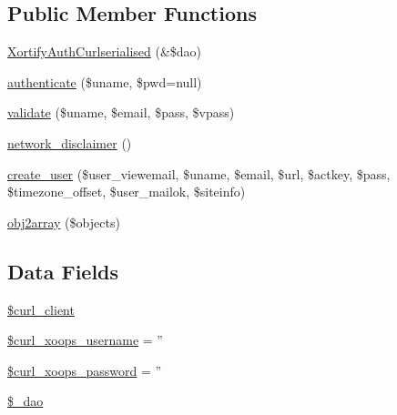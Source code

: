 \subsection*{Public Member Functions}
\begin{DoxyCompactItemize}
\item 
\hyperlink{class_xortify_auth_curlserialised_a5a69ea149424b5e92245daaa880dbb43}{Xortify\-Auth\-Curlserialised} (\&\$dao)
\item 
\hyperlink{class_xortify_auth_curlserialised_a00678ba307326b734e6c679f28bea315}{authenticate} (\$uname, \$pwd=null)
\item 
\hyperlink{class_xortify_auth_curlserialised_a91121a1b702dfd20fb65a027c8ed26ec}{validate} (\$uname, \$email, \$pass, \$vpass)
\item 
\hyperlink{class_xortify_auth_curlserialised_a1874c27b6f81a3f2ff9015405ad0f8bc}{network\-\_\-disclaimer} ()
\item 
\hyperlink{class_xortify_auth_curlserialised_ac72efc5ad313a592cf6706876f56f7ec}{create\-\_\-user} (\$user\-\_\-viewemail, \$uname, \$email, \$url, \$actkey, \$pass, \$timezone\-\_\-offset, \$user\-\_\-mailok, \$siteinfo)
\item 
\hyperlink{class_xortify_auth_curlserialised_aabc52e4f78557f0e0b360a8aaba6e11d}{obj2array} (\$objects)
\end{DoxyCompactItemize}
\subsection*{Data Fields}
\begin{DoxyCompactItemize}
\item 
\hyperlink{class_xortify_auth_curlserialised_a402f2112991f3227835af80e9df33e38}{\$curl\-\_\-client}
\item 
\hyperlink{class_xortify_auth_curlserialised_aab7480ba9f878a02b2c9fd43922fa070}{\$curl\-\_\-xoops\-\_\-username} = ''
\item 
\hyperlink{class_xortify_auth_curlserialised_a6c9851541ed3826c67cfe7224c38f0b8}{\$curl\-\_\-xoops\-\_\-password} = ''
\item 
\hyperlink{class_xortify_auth_curlserialised_a12a029c610f699b4b25e79a1f64a3485}{\$\-\_\-dao}
\end{DoxyCompactItemize}


